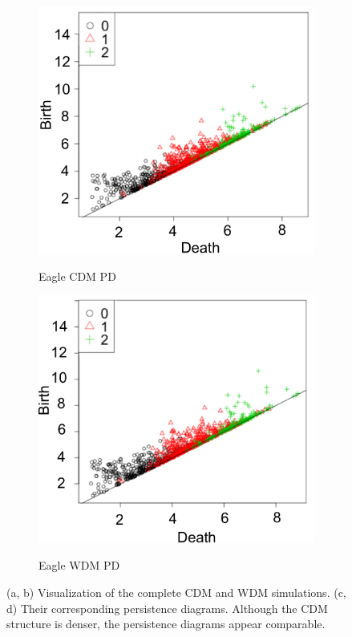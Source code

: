 \documentclass[12pt]{article}
\begin{document}
\begin{figure}[htp!]
  \begin{subfigure}{0.24\textwidth}
    \caption{Eagle CDM PD}
    \includegraphics[width=\linewidth]{cdmdiag.pdf}
    \label{fig:eagleDiagsC}
  \end{subfigure}
  \begin{subfigure}{0.24\textwidth}
    \caption{Eagle WDM PD}
    \includegraphics[width=\linewidth]{wdmdiag.pdf}
    \label{fig:eagleDiagsD}
  \end{subfigure}
  \caption{(a, b) Visualization of the complete CDM and WDM simulations. (c, d) Their corresponding persistence diagrams. Although the CDM structure is denser, the persistence diagrams appear comparable.}

  \label{fig:eagleDiags}
\end{figure}
\end{document}
